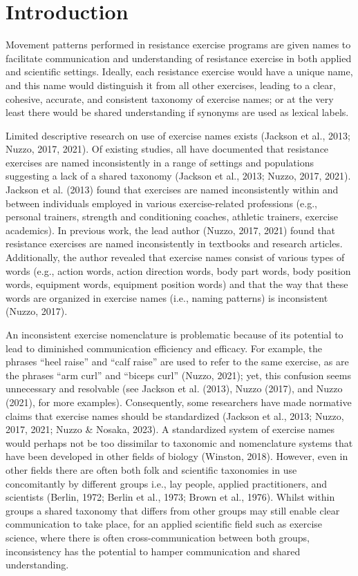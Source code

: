 \documentclass[
]{article}
\begin{document}
\section{Introduction}\label{introduction}

Movement patterns performed in resistance exercise programs are given
names to facilitate communication and understanding of resistance
exercise in both applied and scientific settings. Ideally, each
resistance exercise would have a unique name, and this name would
distinguish it from all other exercises, leading to a clear, cohesive,
accurate, and consistent taxonomy of exercise names; or at the very
least there would be shared understanding if synonyms are used as
lexical labels.

Limited descriptive research on use of exercise names exists (Jackson et
al., 2013; Nuzzo, 2017, 2021). Of existing studies, all have documented
that resistance exercises are named inconsistently in a range of
settings and populations suggesting a lack of a shared taxonomy (Jackson
et al., 2013; Nuzzo, 2017, 2021). Jackson et al. (2013) found that
exercises are named inconsistently within and between individuals
employed in various exercise-related professions (e.g., personal
trainers, strength and conditioning coaches, athletic trainers, exercise
academics). In previous work, the lead author (Nuzzo, 2017, 2021) found
that resistance exercises are named inconsistently in textbooks and
research articles. Additionally, the author revealed that exercise names
consist of various types of words (e.g., action words, action direction
words, body part words, body position words, equipment words, equipment
position words) and that the way that these words are organized in
exercise names (i.e., naming patterns) is inconsistent (Nuzzo, 2017).

An inconsistent exercise nomenclature is problematic because of its
potential to lead to diminished communication efficiency and efficacy.
For example, the phrases ``heel raise'' and ``calf raise'' are used to
refer to the same exercise, as are the phrases ``arm curl'' and ``biceps
curl'' (Nuzzo, 2021); yet, this confusion seems unnecessary and
resolvable (see Jackson et al. (2013), Nuzzo (2017), and Nuzzo (2021),
for more examples). Consequently, some researchers have made normative
claims that exercise names should be standardized (Jackson et al., 2013;
Nuzzo, 2017, 2021; Nuzzo \& Nosaka, 2023). A standardized system of
exercise names would perhaps not be too dissimilar to taxonomic and
nomenclature systems that have been developed in other fields of biology
(Winston, 2018). However, even in other fields there are often both folk
and scientific taxonomies in use concomitantly by different groups i.e.,
lay people, applied practitioners, and scientists (Berlin, 1972; Berlin
et al., 1973; Brown et al., 1976). Whilst within groups a shared
taxonomy that differs from other groups may still enable clear
communication to take place, for an applied scientific field such as
exercise science, where there is often cross-communication between both
groups, inconsistency has the potential to hamper communication and
shared understanding.
\end{document}
